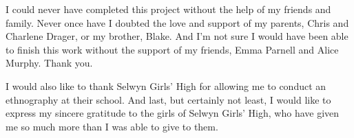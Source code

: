 I could never have completed this project without the help of my friends and family.  Never once have I doubted the love and support of my parents, Chris and Charlene Drager, or my brother, Blake.  And I'm not sure I would have been able to finish this work without the support of my friends, Emma Parnell and Alice Murphy.  Thank you. 

I would also like to thank Selwyn Girls' High for allowing me to conduct an ethnography at their school.  And last, but certainly not least, I would like to express my sincere gratitude to the girls of Selwyn Girls' High, who have given me so much more than I was able to give to them.